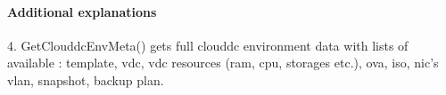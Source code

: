 \documentclass[landscape,a4paper,12pt]{article}
\begin{document}
\begin{center}

\paragraph{Additional explanations}


\begin{flushleft}
4. GetClouddcEnvMeta() gets full clouddc environment data with lists of available :
template,
vdc,
vdc resources (ram, cpu, storages etc.),
ova,
iso,
nic's vlan,
snapshot,
backup plan.
\end{flushleft}



\end{center}
\end{document}

